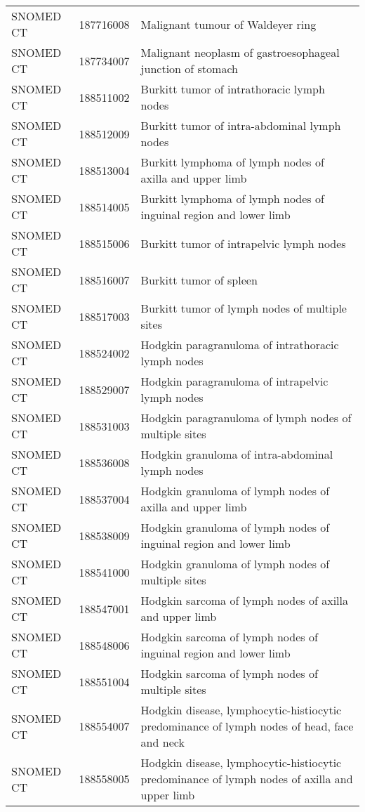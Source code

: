 \begin{longtable}{p{}p{}p{}}
  SNOMED CT & 187716008 & Malignant tumour of Waldeyer ring \\ 
  SNOMED CT & 187734007 & Malignant neoplasm of gastroesophageal junction of stomach \\ 
  SNOMED CT & 188511002 & Burkitt tumor of intrathoracic lymph nodes \\ 
  SNOMED CT & 188512009 & Burkitt tumor of intra-abdominal lymph nodes \\ 
  SNOMED CT & 188513004 & Burkitt lymphoma of lymph nodes of axilla and upper limb \\ 
  SNOMED CT & 188514005 & Burkitt lymphoma of lymph nodes of inguinal region and lower limb \\ 
  SNOMED CT & 188515006 & Burkitt tumor of intrapelvic lymph nodes \\ 
  SNOMED CT & 188516007 & Burkitt tumor of spleen \\ 
  SNOMED CT & 188517003 & Burkitt tumor of lymph nodes of multiple sites \\ 
  SNOMED CT & 188524002 & Hodgkin paragranuloma of intrathoracic lymph nodes \\ 
  SNOMED CT & 188529007 & Hodgkin paragranuloma of intrapelvic lymph nodes \\ 
  SNOMED CT & 188531003 & Hodgkin paragranuloma of lymph nodes of multiple sites \\ 
  SNOMED CT & 188536008 & Hodgkin granuloma of intra-abdominal lymph nodes \\ 
  SNOMED CT & 188537004 & Hodgkin granuloma of lymph nodes of axilla and upper limb \\ 
  SNOMED CT & 188538009 & Hodgkin granuloma of lymph nodes of inguinal region and lower limb \\ 
  SNOMED CT & 188541000 & Hodgkin granuloma of lymph nodes of multiple sites \\ 
  SNOMED CT & 188547001 & Hodgkin sarcoma of lymph nodes of axilla and upper limb \\ 
  SNOMED CT & 188548006 & Hodgkin sarcoma of lymph nodes of inguinal region and lower limb \\ 
  SNOMED CT & 188551004 & Hodgkin sarcoma of lymph nodes of multiple sites \\ 
  SNOMED CT & 188554007 & Hodgkin disease, lymphocytic-histiocytic predominance of lymph nodes of head, face and neck \\ 
  SNOMED CT & 188558005 & Hodgkin disease, lymphocytic-histiocytic predominance of lymph nodes of axilla and upper limb \\ 

\end{longtable}
